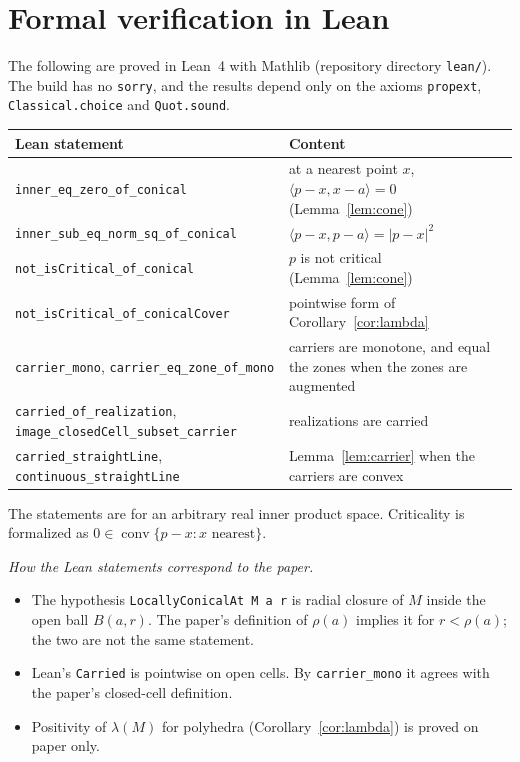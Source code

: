 \documentclass[preprint,12pt]{elsarticle}
\theoremstyle{definition}
\theoremstyle{remark}
\newcommand{\conv}{\operatorname{conv}}
\begin{document}
\section{Formal verification in Lean}\label{sec:lean}

The following are proved in Lean~4 with Mathlib (repository directory \texttt{lean/}). The build has no
\texttt{sorry}, and the results depend only on the axioms \texttt{propext}, \texttt{Classical.choice} and
\texttt{Quot.sound}.

\begin{center}\small
\begin{tabular}{p{6.6cm}p{6.4cm}}
\toprule
Lean statement & Content \\
\midrule
\texttt{inner\_eq\_zero\_of\_conical} & at a nearest point $x$, $\langle p-x,x-a\rangle=0$ (Lemma~\ref{lem:cone}) \\
\texttt{inner\_sub\_eq\_norm\_sq\_of\_conical} & $\langle p-x,p-a\rangle=|p-x|^2$ \\
\texttt{not\_isCritical\_of\_conical} & $p$ is not critical (Lemma~\ref{lem:cone}) \\
\texttt{not\_isCritical\_of\_conicalCover} & pointwise form of Corollary~\ref{cor:lambda} \\
\texttt{carrier\_mono}, \texttt{carrier\_eq\_zone\_of\_mono} & carriers are monotone, and equal the zones when the
zones are augmented \\
\texttt{carried\_of\_realization}, \texttt{image\_closedCell\_subset\_carrier} & realizations are carried \\
\texttt{carried\_straightLine}, \texttt{continuous\_straightLine} & Lemma~\ref{lem:carrier} when the carriers
are convex \\
\bottomrule
\end{tabular}
\end{center}

The statements are for an arbitrary real inner product space. Criticality is formalized as
$0\in\conv\{p-x:x\text{ nearest}\}$.

\emph{How the Lean statements correspond to the paper.}
\begin{itemize}
\item The hypothesis \texttt{LocallyConicalAt M a r} is radial closure of $M$ inside the open ball $B(a,r)$. The
paper's definition of $\rho(a)$ implies it for $r<\rho(a)$; the two are not the same statement.
\item Lean's \texttt{Carried} is pointwise on open cells. By \texttt{carrier\_mono} it agrees with the paper's
closed-cell definition.
\item Positivity of $\lambda(M)$ for polyhedra (Corollary~\ref{cor:lambda}) is proved on paper only.
\end{itemize}
\end{document}
